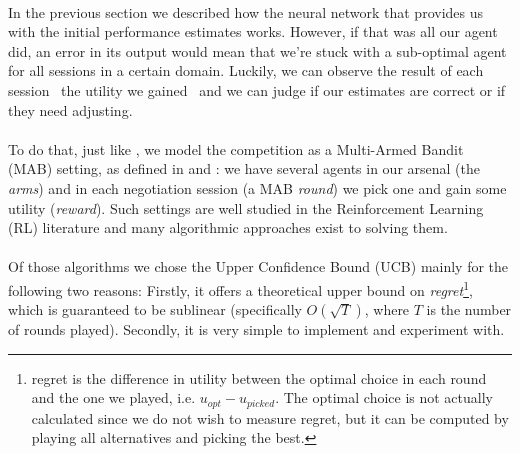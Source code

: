 \paragraph*{}
In the previous section we described how the neural network that provides us with the initial performance estimates works. However, if that was all our agent did, an error in its output would mean that we're stuck with a sub-optimal agent for all sessions in a certain domain. %
Luckily, we can observe the result of each session \textendash \ the utility we gained  \textendash \ and we can judge if our estimates are correct or if they need adjusting.

\paragraph*{}
To do that, just like \cite{meta_agent_paper}, we model the competition as a Multi-Armed Bandit (MAB) setting, as defined in \cite{MAB_Lai_Robbins_1985} and \cite{MAB_paper_2002}: we have several agents in our arsenal (the \emph{arms}) and in each negotiation session (a MAB \emph{round}) we pick one and gain some utility (\emph{reward}). Such settings are well studied in the Reinforcement Learning (RL) literature and many algorithmic approaches exist to solving them. %

\paragraph*{}
Of those algorithms we chose the Upper Confidence Bound (UCB) \cite{UCB_paper} mainly for the following two reasons: Firstly, it offers a theoretical upper bound  on \emph{regret}\footnote{regret is the difference in utility between the optimal choice in each round and the one we played, i.e. $u_{opt} - u_{picked}$. The optimal choice is not actually calculated since we do not wish to measure regret, but it can be computed by playing all alternatives and picking the best.}, which is guaranteed to be sublinear (specifically $O(\sqrt{T})$, where $T$ is the number of rounds played). Secondly, it is very simple to implement and experiment with. %

